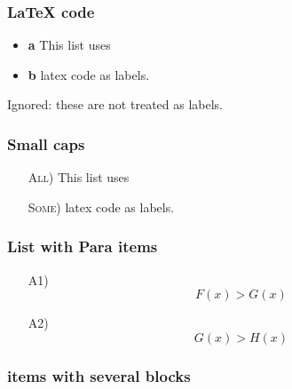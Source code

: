 \documentclass[
]{article}
\providecommand{\tightlist}{%
  \setlength{\itemsep}{0pt}\setlength{\parskip}{0pt}}
\begin{document}
\hypertarget{latex-code}{%
\subsubsection{LaTeX code}\label{latex-code}}

\begin{itemize}
\tightlist
\item
  {\textbf{a}} This list uses
\item
  {\textbf{b}} latex code as labels.
\end{itemize}

Ignored: these are not treated as labels.

\hypertarget{small-caps}{%
\subsubsection{Small caps}\label{small-caps}}

\begin{itemize}
\tightlist

\item[\textsc{All})] This list uses

\item[\textsc{Some})] latex code as labels.

\end{itemize}

\hypertarget{list-with-para-items}{%
\subsubsection{List with Para items}\label{list-with-para-items}}

\begin{itemize}
\tightlist

\item[A1)] \[F(x) > G(x)\]

\item[A2)] \[G(x) > H(x)\]

\end{itemize}

\hypertarget{items-with-several-blocks}{%
\subsubsection{items with several
blocks}\label{items-with-several-blocks}}
\end{document}
